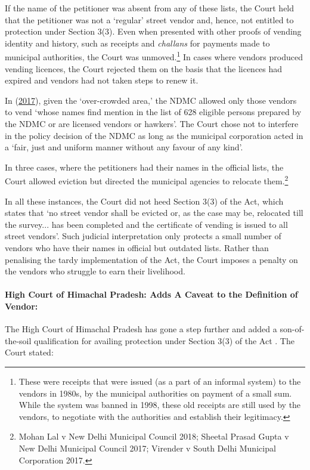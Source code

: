 \documentclass[a4paper, 12pt, twoside, table]{article}
\begin{document}
{If the name of the petitioner was absent from any of these lists, the Court held that the petitioner was not a `regular' street vendor and, hence, not entitled to protection under Section 3(3). Even when presented with other proofs of vending identity and history, such as receipts and \textit{challans} for payments made to municipal authorities, the Court was unmoved.\footnote{ These were receipts that were issued (as a part of an informal system) to the vendors in 1980s, by the municipal authorities on payment of a small sum. While the system was banned in 1998, these old receipts are still used by the vendors, to negotiate with the authorities and establish their legitimacy.}  In cases where vendors produced vending licences, the Court rejected them on the basis that the licences had expired and vendors had not taken steps to renew it. 

In \citeauthor{BhikkiRam} (\href{https://indiankanoon.org/doc/112289789/}{2017}), given the `over-crowded area,' the NDMC allowed only those vendors to vend `whose names find mention in the list of 628 eligible persons prepared by the NDMC or are licensed vendors or hawkers'. The Court chose not to interfere in the policy decision of the NDMC as long as the municipal corporation acted in a `fair, just and uniform manner without any favour of any kind'.

In three cases, where the petitioners had their names in the official lists, the Court allowed eviction but directed the municipal agencies to relocate them.\footnote{ Mohan Lal v New Delhi Municipal Council 2018; Sheetal Prasad Gupta v New Delhi Municipal Council 2017; Virender v South Delhi Municipal Corporation 2017.} 

In all these instances, the Court did not heed Section 3(3) of the Act, which states that `no street vendor shall be evicted or, as the case may be, relocated till the survey... has been completed and the certificate of vending is issued to all street vendors'. Such judicial interpretation only protects a small number of vendors who have their names in official but outdated lists. Rather than penalising the tardy implementation of the Act, the Court imposes a penalty on the vendors who struggle to earn their livelihood. 

\paragraph*{High Court of Himachal Pradesh: Adds A Caveat to the Definition of Vendor:}
The High Court of Himachal Pradesh has gone a step further and added a son-of-the-soil qualification for availing protection under Section 3(3) of the Act \parencite{HariRam}. The Court stated: 

}
\end{document}
